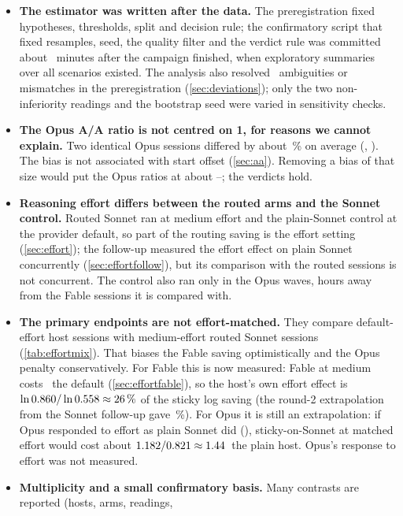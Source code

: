 \begin{itemize}
    but the exact runner code was not under version control while it ran.
  \item \textbf{The estimator was written after the data.} The preregistration fixed hypotheses, thresholds,
    split and decision rule; the confirmatory script that fixed resamples, seed, the quality filter and the
    verdict rule was committed about \ConfirmAfterMin\ minutes after the campaign finished, when exploratory
    summaries over all scenarios existed. The analysis also resolved \NDeviations\ ambiguities or mismatches
    in the preregistration (\cref{sec:deviations}); only the two non-inferiority readings and the bootstrap
    seed were varied in sensitivity checks.
  \item \textbf{The Opus A/A ratio is not centred on 1, for reasons we cannot explain.} Two identical Opus
    sessions differed by about \AAOpusPct\,\% on average (\AAOpus, \AAOpusCI). The bias is not associated with
    start offset (\cref{sec:aa}). Removing a bias of that size would put the Opus ratios at about
    \OpusAdjLow--\OpusAdjHigh; the verdicts hold.
  \item \textbf{Reasoning effort differs between the routed arms and the Sonnet control.} Routed Sonnet ran at
    medium effort and the plain-Sonnet control at the provider default, so part of the routing saving is the
    effort setting (\cref{sec:effort}); the follow-up measured the effort effect on plain Sonnet concurrently
    (\cref{sec:effortfollow}), but its comparison with the routed sessions is not concurrent. The control also ran only in the Opus waves, hours away from the Fable
    sessions it is compared with.
  \item \textbf{The primary endpoints are not effort-matched.} They compare default-effort host sessions with
    medium-effort routed Sonnet sessions (\cref{tab:effortmix}). That biases the Fable saving optimistically and the Opus
    penalty conservatively. For Fable this is now measured: Fable at medium costs \EfRatio\X\ the default
    (\cref{sec:effortfable}), so the host's own effort effect is $\ln 0.860 / \ln 0.558 \approx
    26\,\%$ of the sticky log saving (the round-2 extrapolation from the Sonnet follow-up gave
    \RgEffShareFable\,\%). For Opus it is still an extrapolation: if Opus responded to effort as plain Sonnet did
    (\EcRatio\X), sticky-on-Sonnet at matched effort would cost about
    $1.182 / 0.821 \approx 1.44$\X\ the plain host. Opus's response to effort was not
    measured.
  \item \textbf{Multiplicity and a small confirmatory basis.} Many contrasts are reported (hosts, arms, readings,

\end{itemize}

